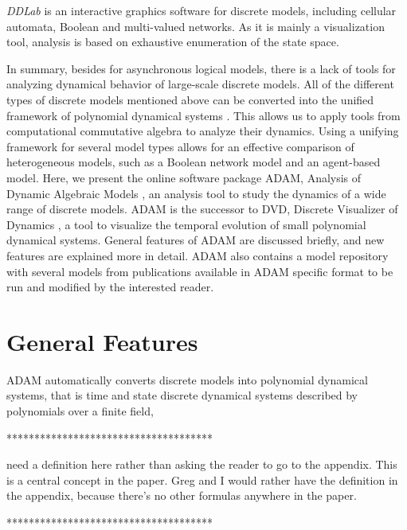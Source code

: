 \documentclass[11pt]{amsart}
\begin{document}
{\it DDLab} is an interactive graphics software for discrete models, including cellular automata, Boolean and multi-valued networks. As it is mainly a visualization tool, analysis is based on exhaustive enumeration of the state space.


 
In summary, besides for asynchronous logical models, there is a lack of tools
for analyzing dynamical behavior of large-scale discrete models. All of the different types of discrete models mentioned above can be
converted into the unified framework of polynomial dynamical systems
\cite{Alan:Bioinf2010, Hinkelmann:2010}. This allows us to apply tools from
computational commutative algebra to analyze their dynamics. Using a unifying framework for several model types
allows for an effective comparison of heterogeneous models, such as a Boolean network model and an agent-based model.
Here, we present the online software package ADAM, Analysis of Dynamic Algebraic Models \cite{ADAM}, an analysis tool to study the dynamics of a wide range of discrete models. ADAM is the successor to DVD, Discrete Visualizer of Dynamics \cite{DVD}, a tool to visualize the temporal evolution of small polynomial dynamical systems.
General features of ADAM are discussed briefly, and new features are explained more in detail. ADAM also contains a model repository with several models from publications available in ADAM specific format to be run and modified by the interested reader.
 
\section{General Features}
ADAM automatically converts discrete models into polynomial dynamical
systems, that is time and state discrete dynamical systems described by polynomials over a finite field,
 
*************************************
 
need a definition here rather than asking the reader to go to the appendix. This is a central
concept in the paper. Greg and I would rather have the definition in the appendix, because there’s no other formulas anywhere in the paper. 
 
*************************************
 
\end{document}
